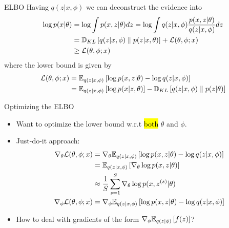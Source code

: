 \documentclass[unicode,11pt]{beamer}
\begin{document}
\begin{frame}{ELBO}
  Having $q(z|x, \phi)$ we can deconstruct the evidence into
  \begin{align*}
    \log p(x|\theta)
    &= \log \int p(x, z|\theta) dz
     = \log \int q(z|x, \phi) \frac{p(x, z|\theta)}{q(z|x, \phi)} dz \\
    &= \mathbb{D}_{KL}\left[ q(z|x, \phi) \parallel p(z|x, \theta) \right] + \mathcal{L}(\theta, \phi; x) \\
    &\ge \mathcal{L}(\theta, \phi; x)
  \end{align*}
  where the lower bound is given by
  \begin{align*}
    \mathcal{L}(\theta, \phi; x)
    &= \E{q(z|x, \phi)}{\log p(x, z|\theta) - \log q(z|x, \phi)} \\
    &= \E{q(z|x, \phi)}{\log p(x|z, \theta)}
     - \KL{q(z|x, \phi)}{p(z|\theta)}
  \end{align*}

\end{frame}


\begin{frame}{Optimizing the ELBO}
  \begin{itemize}
  \item Want to optimize the lower bound w.r.t \hl{both} $\theta$ and $\phi$.
  \item Just-do-it approach:
    \begin{align*}
      \grad_\theta \mathcal{L}(\theta, \phi; x)
      &= \grad_\theta \E{q(z|x, \phi)}{\log p(x, z|\theta) - \log q(z|x, \phi)} \\
      &= \E{q(z|x, \phi)}{\grad_\theta \log p(x, z|\theta)} \\
      &\approx \frac{1}{S} \sum\limits_{s = 1}^S
           \grad_\theta \log p(x, z^{(s)}|\theta) \\
      \grad_\phi \mathcal{L}(\theta, \phi; x)
      &= \grad_\phi \E{q(z|x, \phi)}{\log p(x, z|\theta) - \log q(z|x, \phi)}
    \end{align*}
  \item How to deal with gradients of the form $\grad_\phi \E{q(z|\phi)}{f(z)}$?
  \end{itemize}
\end{frame}
\end{document}
